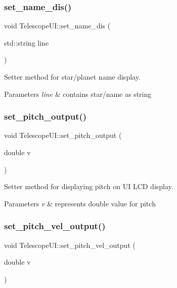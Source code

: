 \subsubsection{\texorpdfstring{set\+\_\+name\+\_\+dis()}{set\_name\_dis()}}
{\footnotesize\ttfamily void Telescope\+U\+I\+::set\+\_\+name\+\_\+dis (\begin{DoxyParamCaption}\item[{std\+::string}]{line }\end{DoxyParamCaption})}



Setter method for star/planet name display. 


\begin{DoxyParams}{Parameters}
{\em line} & contains star/name as string \\
\hline
\end{DoxyParams}
\mbox{\label{classTelescopeUI_a4388ce748e1ad31dbb5d9d4df38c750b}} 
\subsubsection{\texorpdfstring{set\+\_\+pitch\+\_\+output()}{set\_pitch\_output()}}
{\footnotesize\ttfamily void Telescope\+U\+I\+::set\+\_\+pitch\+\_\+output (\begin{DoxyParamCaption}\item[{double}]{v }\end{DoxyParamCaption})}



Setter method for displaying pitch on UI \textquotesingle{}L\+CD display\textquotesingle{}. 


\begin{DoxyParams}{Parameters}
{\em v} & represents double value for pitch \\
\hline
\end{DoxyParams}
\mbox{\label{classTelescopeUI_a3d767f297da01b6cb685578ed2479e25}} 
\subsubsection{\texorpdfstring{set\+\_\+pitch\+\_\+vel\+\_\+output()}{set\_pitch\_vel\_output()}}
{\footnotesize\ttfamily void Telescope\+U\+I\+::set\+\_\+pitch\+\_\+vel\+\_\+output (\begin{DoxyParamCaption}\item[{double}]{v }\end{DoxyParamCaption})}



